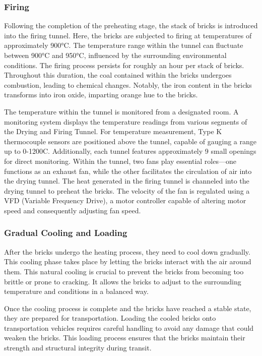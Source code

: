 \subsubsection{Firing}
Following the completion of the preheating stage, the stack of bricks is introduced into the firing tunnel. Here, the bricks are subjected to firing at temperatures of approximately 900°C. The temperature range within the tunnel can fluctuate between 900°C and 950°C, influenced by the surrounding environmental conditions. The firing process persists for roughly an hour per stack of bricks. Throughout this duration, the coal contained within the bricks undergoes combustion, leading to chemical changes. Notably, the iron content in the bricks transforms into iron oxide, imparting orange hue to the bricks.

\vspace{0.1cm}
The temperature within the tunnel is monitored from a designated room. A monitoring system displays the temperature readings from various segments of the Drying and Firing Tunnel. For temperature measurement, Type K thermocouple sensors are positioned above the tunnel, capable of gauging a range up to 0-1200\degree C. Additionally, each tunnel features approximately 9 small openings for direct monitoring. Within the tunnel, two fans play essential roles—one functions as an exhaust fan, while the other facilitates the circulation of air into the drying tunnel. The heat generated in the firing tunnel is channeled into the drying tunnel to preheat the bricks. The velocity of the fan is regulated using a VFD (Variable Frequency Drive), a motor controller capable of altering motor speed and consequently adjusting fan speed.

\subsubsection{Gradual Cooling and Loading}
After the bricks undergo the heating process, they need to cool down gradually. This cooling phase takes place by letting the bricks interact with the air around them. This natural cooling is crucial to prevent the bricks from becoming too brittle or prone to cracking. It allows the bricks to adjust to the surrounding temperature and conditions in a balanced way.

Once the cooling process is complete and the bricks have reached a stable state, they are prepared for transportation. Loading the cooled bricks onto transportation vehicles requires careful handling to avoid any damage that could weaken the bricks. This loading process ensures that the bricks maintain their strength and structural integrity during transit.